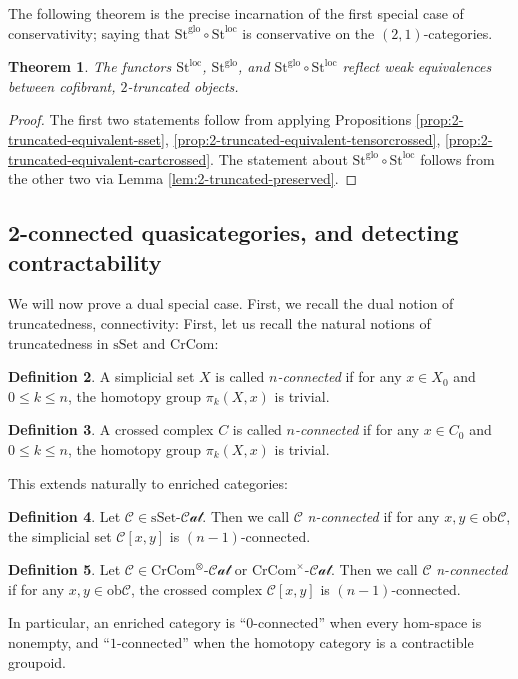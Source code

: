 \documentclass[12pt]{article}
\newtheorem{theorem}{Theorem}[section]
\theoremstyle{definition}
\newtheorem{definition}[theorem]{Definition}
\newcommand{\C}{\mathcal{C}}
\newcommand{\sset}{\text{sSet}}
\newcommand{\crcom}{\text{CrCom}}
\newcommand{\cartcrossedcat}{\crcom^\times\text{-}\mathcal{Cat}}
\newcommand{\tensorcrossedcat}{\crcom^\otimes\text{-}\mathcal{Cat}}
\newcommand{\ssetcat}{\text{sSet}\text{-}\mathcal{Cat}}
\newcommand{\ob}{\text{ob}}
\newcommand{\st}{\text{St}}
\newcommand{\leftone}{\st^{\text{loc}}}
\newcommand{\lefttwo}{\st^{\text{glo}}}
\begin{document}
	The following theorem is the precise incarnation of the first special case of conservativity; saying that $\lefttwo \circ \leftone$ is conservative on the $(2,1)$-categories.
	\begin{theorem}
		The functors $\leftone$, $\lefttwo$, and $\lefttwo \circ \leftone$ reflect weak equivalences between cofibrant, $2$-truncated objects.
	\end{theorem}
	\begin{proof}
		The first two statements follow from applying Propositions \ref{prop:2-truncated-equivalent-sset}, \ref{prop:2-truncated-equivalent-tensorcrossed}, \ref{prop:2-truncated-equivalent-cartcrossed}. The statement about $\lefttwo \circ \leftone$ follows from the other two via Lemma \ref{lem:2-truncated-preserved}. 
	\end{proof}
\subsection{2-connected quasicategories, and detecting contractability}
	We will now prove a dual special case. First, we recall the dual notion of truncatedness, connectivity: 
	First, let us recall the natural notions of truncatedness in $\sset$ and $\crcom$:
	\begin{definition}
		A simplicial set $X$ is called \emph{$n$-connected} if for any $x \in X_0$ and $0\le k \le n$, the homotopy group $\pi_k(X,x)$ is trivial.
	\end{definition}
	\begin{definition}
		A crossed complex $C$ is called \emph{$n$-connected} if for any $x \in C_0$ and $0 \le k \le n$, the homotopy group $\pi_k(X,x)$ is trivial. 
	\end{definition}
	This extends naturally to enriched categories:
	\begin{definition}\label{dfn:n-connected-ssetcat}
		Let $\C \in \ssetcat$. Then we call $\C$ \emph{n-connected} if for any $x,y \in \ob \C$, the simplicial set $\C[x,y]$ is $(n-1)$-connected.
	\end{definition}
	\begin{definition}\label{dfn:n-truncated-crossedcat}
		Let $\C \in \tensorcrossedcat$ or $\cartcrossedcat$. Then we call $\C$ \emph{n-connected} if for any $x,y \in \ob \C$, the crossed complex $\C[x,y]$ is $(n-1)$-connected.
	\end{definition}
	In particular, an enriched category is ``$0$-connected'' when every hom-space is nonempty, and ``$1$-connected'' when the homotopy category is a contractible groupoid. 
\end{document}
